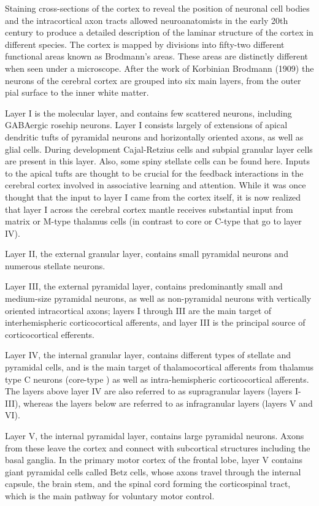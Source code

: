 \documentclass[]{book}
\begin{document}
Staining cross-sections of the cortex to reveal the position of neuronal cell bodies and the intracortical axon tracts allowed neuroanatomists in the early 20th century to produce a detailed description of the laminar structure of the cortex in different species. The cortex is mapped by divisions into fifty-two different functional areas known as Brodmann's areas. These areas are distinctly different when seen under a microscope. After the work of Korbinian Brodmann (1909) the neurons of the cerebral cortex are grouped into six main layers, from the outer pial surface to the inner white matter.

Layer I is the molecular layer, and contains few scattered neurons, including GABAergic rosehip neurons. Layer I consists largely of extensions of apical dendritic tufts of pyramidal neurons and horizontally oriented axons, as well as glial cells. During development Cajal-Retzius cells and subpial granular layer cells are present in this layer. Also, some spiny stellate cells can be found here. Inputs to the apical tufts are thought to be crucial for the feedback interactions in the cerebral cortex involved in associative learning and attention. While it was once thought that the input to layer I came from the cortex itself, it is now realized that layer I across the cerebral cortex mantle receives substantial input from matrix or M-type thalamus cells (in contrast to core or C-type that go to layer IV).

Layer II, the external granular layer, contains small pyramidal neurons and numerous stellate neurons.

Layer III, the external pyramidal layer, contains predominantly small and medium-size pyramidal neurons, as well as non-pyramidal neurons with vertically oriented intracortical axons; layers I through III are the main target of interhemispheric corticocortical afferents, and layer III is the principal source of corticocortical efferents.

Layer IV, the internal granular layer, contains different types of stellate and pyramidal cells, and is the main target of thalamocortical afferents from thalamus type C neurons (core-type ) as well as intra-hemispheric corticocortical afferents. The layers above layer IV are also referred to as supragranular layers (layers I-III), whereas the layers below are referred to as infragranular layers (layers V and VI).

Layer V, the internal pyramidal layer, contains large pyramidal neurons. Axons from these leave the cortex and connect with subcortical structures including the basal ganglia. In the primary motor cortex of the frontal lobe, layer V contains giant pyramidal cells called Betz cells, whose axons travel through the internal capsule, the brain stem, and the spinal cord forming the corticospinal tract, which is the main pathway for voluntary motor control.
\end{document}
